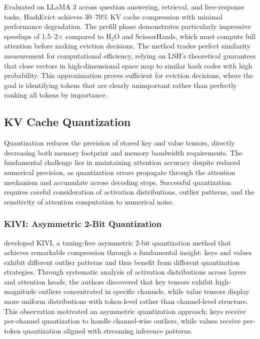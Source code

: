 Evaluated on LLaMA 3 across question answering, retrieval, and free-response tasks, HashEvict achieves 30--70\% KV cache compression with minimal performance degradation. The prefill phase demonstrates particularly impressive speedups of 1.5--2$\times$ compared to H$_2$O and ScissorHands, which must compute full attention before making eviction decisions. The method trades perfect similarity measurement for computational efficiency, relying on LSH's theoretical guarantees that close vectors in high-dimensional space map to similar hash codes with high probability. This approximation proves sufficient for eviction decisions, where the goal is identifying tokens that are clearly unimportant rather than perfectly ranking all tokens by importance.

\subsection{KV Cache Quantization}

Quantization reduces the precision of stored key and value tensors, directly decreasing both memory footprint and memory bandwidth requirements. The fundamental challenge lies in maintaining attention accuracy despite reduced numerical precision, as quantization errors propagate through the attention mechanism and accumulate across decoding steps. Successful quantization requires careful consideration of activation distributions, outlier patterns, and the sensitivity of attention computation to numerical noise.

\subsubsection{KIVI: Asymmetric 2-Bit Quantization}

\citet{liu2024kivi} developed KIVI, a tuning-free asymmetric 2-bit quantization method that achieves remarkable compression through a fundamental insight: keys and values exhibit different outlier patterns and thus benefit from different quantization strategies. Through systematic analysis of activation distributions across layers and attention heads, the authors discovered that key tensors exhibit high-magnitude outliers concentrated in specific channels, while value tensors display more uniform distributions with token-level rather than channel-level structure. This observation motivated an asymmetric quantization approach: keys receive per-channel quantization to handle channel-wise outliers, while values receive per-token quantization aligned with streaming inference patterns.

